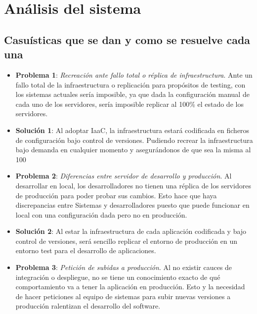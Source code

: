 \chapter {Análisis del sistema}

\section{Casuísticas que se dan y como se resuelve cada una}
                \begin{itemize}
                        \item \textbf{Problema 1}: \textit{Recreación ante fallo total o réplica de infraestructura}. Ante un fallo total de la infraestructura o replicación para propósitos de testing, con los sistemas actuales sería imposible, ya que dada la configuración manual de cada uno de los servidores, sería imposible replicar al 100\% el estado de los servidores. 

                        \item \textbf {Solución 1}: Al adoptar IaaC, la infraestructura estará codificada en ficheros de configuración bajo control de versiones. Pudiendo recrear la infraestructura bajo demanda en cualquier momento y asegurándonos de que sea la misma al 100%

                        \item \textbf{Problema 2}: \textit{Diferencias entre servidor de desarrollo y producción}. Al desarrollar en local, los desarrolladores no tienen una réplica de los servidores de producción para poder probar sus cambios. Esto hace que haya discrepancias entre Sistemas y desarrolladores puesto que puede funcionar en local con una configuración dada pero no en producción. 

                        \item \textbf {Solución 2}: Al estar la infraestructura de cada aplicación codificada y bajo control de versiones, será sencillo replicar el entorno de producción en un entorno test para el desarrollo de aplicaciones.

                        \item \textbf{Problema 3}: \textit{Petición de subidas a producción}. Al no existir cauces de integración o despliegue, no se tiene un conocimiento exacto de qué comportamiento va a tener la aplicación en producción. Esto y la necesidad de hacer peticiones al equipo de sistemas para subir nuevas versiones a producción ralentizan el desarrollo del software.


\end{itemize}
